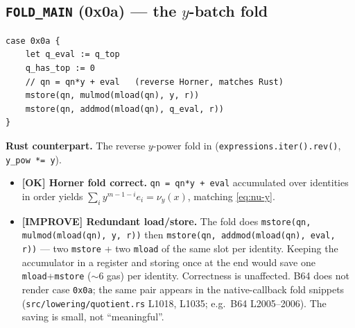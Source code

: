 \subsection{\texttt{FOLD\_MAIN} (0x0a) --- the $y$-batch fold}
\begin{lstlisting}[style=yul]
case 0x0a {
    let q_eval := q_top
    q_has_top := 0
    // qn = qn*y + eval   (reverse Horner, matches Rust)
    mstore(qn, mulmod(mload(qn), y, r))
    mstore(qn, addmod(mload(qn), q_eval, r))
}
\end{lstlisting}
\textbf{Rust counterpart.} The reverse $y$-power fold in
(\texttt{expressions.iter().rev()}, \texttt{y\_pow *= y}).

\begin{itemize}
  \item \textcolor{tracegreen}{\textbf{[OK] Horner fold correct.}}
        \texttt{qn = qn*y + eval} accumulated over identities in order
        yields $\sum_i y^{m-1-i} e_i = \nu_y(x)$, matching
        \eqref{eq:nu-y}.
  \item \textcolor{codegenblue}{\textbf{[IMPROVE] Redundant
        load/store.}} The fold does \texttt{mstore(qn, mulmod(mload(qn),
        y, r))} then \texttt{mstore(qn, addmod(mload(qn), eval, r))}
        --- two \texttt{mstore} + two \texttt{mload} of the same slot per
        identity. Keeping the accumulator in a register and storing once
        at the end would save one \texttt{mload}+\texttt{mstore}
        ($\sim$6 gas) per identity. Correctness is unaffected.
         B64 does not render case \texttt{0x0a}; the same
        pair appears in the native-callback fold snippets
        (\texttt{src/\allowbreak{}lowering/\allowbreak{}quotient.rs} L1018, L1035; e.g.\ B64
        L2005--2006). The saving is small, not ``meaningful''.
\end{itemize}


